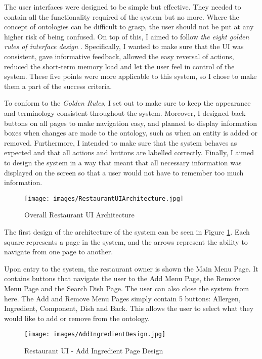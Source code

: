 The user interfaces were designed to be simple but effective. They needed to contain all the functionality required of the system but no more. Where the concept of ontologies can be difficult to grasp, the user should not be put at any higher risk of being confused. On top of this, I aimed to follow \textit{the eight golden rules of interface design} \cite{shneiderman}. Specifically, I wanted to make sure that the UI was consistent, gave informative feedback, allowed the easy reversal of actions, reduced the short-term memory load and let the user feel in control of the system. These five points were more applicable to this system, so I chose to make them a part of the success criteria.

To conform to the \textit{Golden Rules}, I set out to make sure to keep the appearance and terminology consistent throughout the system. Moreover, I designed back buttons on all pages to make navigation easy, and planned to display information boxes when changes are made to the ontology, such as when an entity is added or removed. Furthermore, I intended to make sure that the system behaves as expected and that all actions and buttons are labelled correctly. Finally, I aimed to design the system in a way that meant that all necessary information was displayed on the screen so that a user would not have to remember too much information.

\begin{figure}[h]
    \centering
    \captionsetup{justification=centering}
    \texttt{[image: images/RestaurantUIArchitecture.jpg]}
    \caption{Overall Restaurant UI Architecture}
    \label{fig:restaurantUI_architecture}
\end{figure}

The first design of the architecture of the system can be seen in Figure \ref{fig:restaurantUI_architecture}. Each square represents a page in the system, and the arrows represent the ability to navigate from one page to another.

Upon entry to the system, the restaurant owner is shown the Main Menu Page. It contains buttons that navigate the user to the Add Menu Page, the Remove Menu Page and the Search Dish Page. The user can also close the system from here. The Add and Remove Menu Pages simply contain 5 buttons: Allergen, Ingredient, Component, Dish and Back. This allows the user to select what they would like to add or remove from the ontology.

\begin{figure}[h]
    \centering
    \captionsetup{justification=centering}
    \texttt{[image: images/AddIngredientDesign.jpg]}
    \caption{Restaurant UI - Add Ingredient Page Design}
    \label{fig:restaurantUI_add_page_design}
\end{figure}

